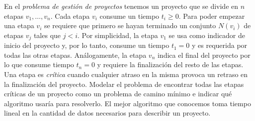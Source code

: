 

 \item En el \emph{problema de gestión de proyectos} tenemos un proyecto que se divide en $n$ etapas $v_1, \ldots, v_n$.  Cada etapa $v_i$ consume un tiempo $t_i \geq 0$. Para poder empezar una etapa $v_i$ se requiere que primero se hayan terminado un conjunto $N(v_i)$ de etapas $v_j$ tales que $j < i$.  Por simplicidad, la etapa $v_1$ se usa como indicador de inicio del proyecto y, por lo tanto, consume un tiempo $t_1 = 0$ y es requerida por todas las otras etapas.  Análogamente, la etapa $v_n$ indica el final del proyecto por lo que consume tiempo $t_n = 0$ y requiere la finalización del resto de las etapas.  Una etapa es \emph{crítica} cuando cualquier atraso en la misma provoca un retraso en la finalización del proyecto.  Modelar el problema de encontrar todas las etapas críticas de un proyecto como un problema de camino mínimo e indicar qué algoritmo usaría para resolverlo.  El mejor algoritmo que conocemos toma tiempo lineal en la cantidad de datos necesarios para describir un proyecto.


